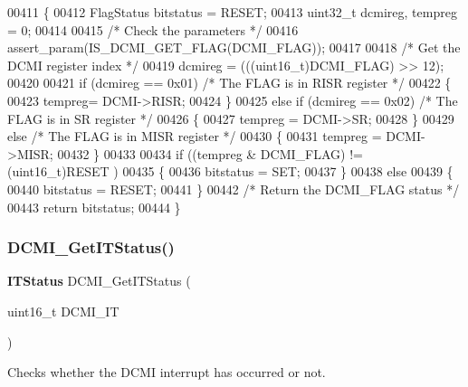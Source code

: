 \begin{DoxyCode}
00411 \{
00412   FlagStatus bitstatus = RESET;
00413   uint32\_t dcmireg, tempreg = 0;
00414 
00415   \textcolor{comment}{/* Check the parameters */}
00416   assert_param(IS_DCMI_GET_FLAG(DCMI\_FLAG));
00417   
00418   \textcolor{comment}{/* Get the DCMI register index */}
00419   dcmireg = (((uint16\_t)DCMI\_FLAG) >> 12);
00420   
00421   \textcolor{keywordflow}{if} (dcmireg == 0x01) \textcolor{comment}{/* The FLAG is in RISR register */}
00422   \{
00423     tempreg= DCMI->RISR;
00424   \}
00425   \textcolor{keywordflow}{else} \textcolor{keywordflow}{if} (dcmireg == 0x02) \textcolor{comment}{/* The FLAG is in SR register */}
00426   \{
00427     tempreg = DCMI->SR;
00428   \}
00429   \textcolor{keywordflow}{else} \textcolor{comment}{/* The FLAG is in MISR register */}
00430   \{
00431     tempreg = DCMI->MISR;
00432   \}
00433   
00434   \textcolor{keywordflow}{if} ((tempreg & DCMI\_FLAG) != (uint16\_t)RESET )
00435   \{
00436     bitstatus = SET;
00437   \}
00438   \textcolor{keywordflow}{else}
00439   \{
00440     bitstatus = RESET;
00441   \}
00442   \textcolor{comment}{/* Return the DCMI\_FLAG status */}
00443   \textcolor{keywordflow}{return}  bitstatus;
00444 \}
\end{DoxyCode}
\mbox{\label{group__DCMI__Group3_gac0b27821aab3ee6b73ae8a6c6339fed5}} 
\subsubsection{D\+C\+M\+I\+\_\+\+Get\+I\+T\+Status()}
{\footnotesize\ttfamily \textbf{ I\+T\+Status} D\+C\+M\+I\+\_\+\+Get\+I\+T\+Status (\begin{DoxyParamCaption}\item[{uint16\+\_\+t}]{D\+C\+M\+I\+\_\+\+IT }\end{DoxyParamCaption})}



Checks whether the D\+C\+MI interrupt has occurred or not. 


